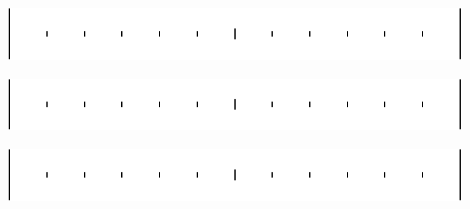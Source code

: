 \documentclass[12pt]{article}
\begin{document}
\vspace{0.5in}
\begin{minipage}{0.6\textwidth}
	\begin{center}
		\includegraphics[width=0.9\textwidth]{string-crop.pdf}
	\end{center}
\end{minipage}
\begin{minipage}{0.2\textwidth}
	\hspace{0.5in}
\end{minipage}
\begin{minipage}{0.2\textwidth}
	\begin{center}

	\end{center}	
\end{minipage}


\vspace{0.5in}
\begin{minipage}{0.6\textwidth}
	\begin{center}
		\includegraphics[width=0.9\textwidth]{string-crop.pdf}
	\end{center}
\end{minipage}
\begin{minipage}{0.2\textwidth}
	\hspace{0.5in}
\end{minipage}
\begin{minipage}{0.2\textwidth}
	\begin{center}
		
	\end{center}	
\end{minipage}


\vspace{0.5in}
\begin{minipage}{0.6\textwidth}
	\begin{center}
		\includegraphics[width=0.9\textwidth]{string-crop.pdf}
	\end{center}
\end{minipage}
\begin{minipage}{0.2\textwidth}
	\hspace{0.5in}
\end{minipage}
\begin{minipage}{0.2\textwidth}
	\begin{center}
		
	\end{center}	
\end{minipage}
\end{document}
